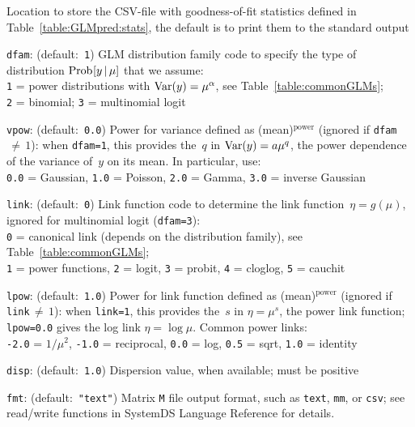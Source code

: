 \begin{Description}
Location to store the CSV-file with goodness-of-fit statistics defined in
Table~\ref{table:GLMpred:stats}, the default is to print them to the standard output
\item[{\tt dfam}:] (default:\mbox{ }{\tt 1})
GLM distribution family code to specify the type of distribution $\mathop{\mathrm{Prob}\hspace{0.5pt}}\nolimits[y\,|\,\mu]$
that we assume: \\
{\tt 1} = power distributions with $\mathop{\mathrm{Var}}\nolimits(y) = \mu^{\alpha}$, see Table~\ref{table:commonGLMs};\\
{\tt 2} = binomial; 
{\tt 3} = multinomial logit
\item[{\tt vpow}:] (default:\mbox{ }{\tt 0.0})
Power for variance defined as (mean)${}^{\textrm{power}}$ (ignored if {\tt dfam}$\,{\neq}\,1$):
when {\tt dfam=1}, this provides the~$q$ in $\mathop{\mathrm{Var}}\nolimits(y) = a\mu^q$, the power
dependence of the variance of~$y$ on its mean.  In particular, use:\\
{\tt 0.0} = Gaussian,
{\tt 1.0} = Poisson,
{\tt 2.0} = Gamma,
{\tt 3.0} = inverse Gaussian
\item[{\tt link}:] (default:\mbox{ }{\tt 0})
Link function code to determine the link function~$\eta = g(\mu)$, ignored for
multinomial logit ({\tt dfam=3}):\\
{\tt 0} = canonical link (depends on the distribution family), see Table~\ref{table:commonGLMs};\\
{\tt 1} = power functions,
{\tt 2} = logit,
{\tt 3} = probit,
{\tt 4} = cloglog,
{\tt 5} = cauchit
\item[{\tt lpow}:] (default:\mbox{ }{\tt 1.0})
Power for link function defined as (mean)${}^{\textrm{power}}$ (ignored if {\tt link}$\,{\neq}\,1$):
when {\tt link=1}, this provides the~$s$ in $\eta = \mu^s$, the power link
function; {\tt lpow=0.0} gives the log link $\eta = \log\mu$.  Common power links:\\
{\tt -2.0} = $1/\mu^2$,
{\tt -1.0} = reciprocal,
{\tt 0.0} = log,
{\tt 0.5} = sqrt,
{\tt 1.0} = identity
\item[{\tt disp}:] (default:\mbox{ }{\tt 1.0})
Dispersion value, when available; must be positive
\item[{\tt fmt}:] (default:\mbox{ }{\tt "text"})
Matrix {\tt M} file output format, such as {\tt text}, {\tt mm}, or {\tt csv};
see read/write functions in SystemDS Language Reference for details.
\end{Description}


